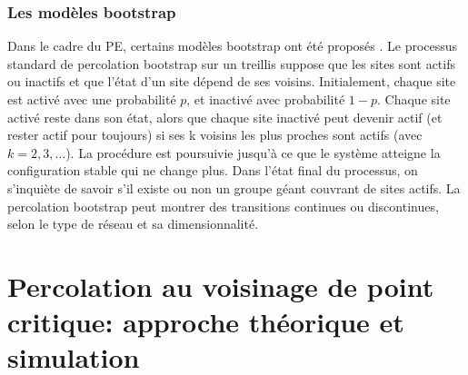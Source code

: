 \subsubsection{Les modèles bootstrap}
Dans le cadre du PE, certains modèles bootstrap ont été proposés \cite{Baxter-al2010}. Le processus standard de percolation bootstrap sur un treillis suppose que les sites sont actifs ou inactifs et que l'état d'un site dépend de ses voisins. Initialement, chaque site est activé avec une probabilité $p$, et inactivé avec probabilité $1-p$. Chaque site activé reste dans son état, alors que chaque site inactivé peut devenir actif (et rester actif pour toujours) si ses k voisins les plus proches sont actifs (avec $k=2,3,\ldots$). La procédure est poursuivie jusqu'à ce que le système atteigne la configuration stable qui ne change plus. Dans l'état final du processus, on s'inquiète de savoir s'il existe ou non un groupe géant couvrant de sites actifs. La percolation bootstrap peut montrer des transitions continues ou discontinues, selon le type de réseau et sa dimensionnalité.
\begin{sloppypar}
\section{Percolation au voisinage de point critique: approche théorique et simulation}
\end{sloppypar}
